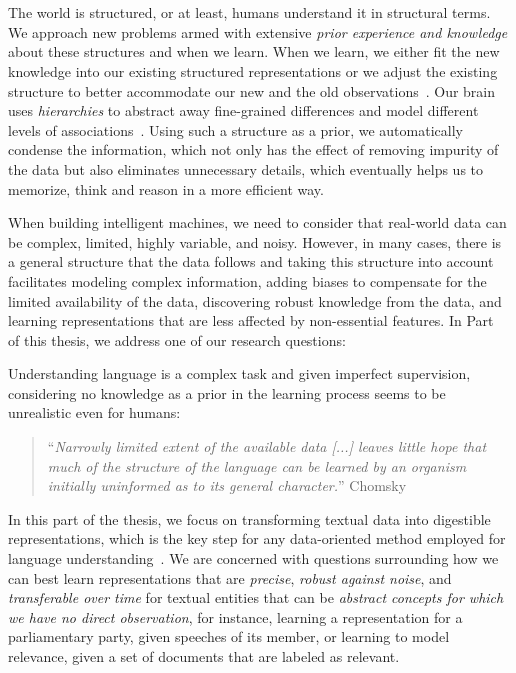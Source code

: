 \part{}
\label{part1}
%
The world is structured, or at least, humans understand it in structural terms. We approach new problems armed with extensive \emph{prior experience and knowledge} about these structures and when we learn. 
When we learn, we either fit the new knowledge into our existing structured representations or we adjust the existing structure to better accommodate our new and the old observations~\citep{battaglia2018relational}.
%
Our brain uses \emph{hierarchies} to abstract away fine-grained differences and model different levels of associations~\citep{Ballard:2015}. Using such a structure as a prior, we automatically condense the information, which not only has the effect of removing impurity of the data but also eliminates unnecessary details, which eventually helps us to memorize, think and reason in a more efficient way.

When building intelligent machines, we need to consider that real-world data can be complex, limited, highly variable, and noisy. However, in many cases, there is a general structure that the data follows and taking this structure into account facilitates modeling complex information, adding biases to compensate for the limited availability of the data, discovering robust knowledge from the data, and learning representations that are less affected by non-essential features. 
%
In Part~\ref{part1} of this thesis, we address one of our research questions:

Understanding language is a complex task and given imperfect supervision, considering no knowledge as a prior in the learning process seems to be unrealistic even for humans: 
\begin{quote}
    ``\emph{Narrowly limited extent of the available data [...] leaves little hope that much of the structure of the language can be learned by an organism initially uninformed as to its general character.}'' Chomsky~\citep{chomsky1965}
\end{quote}

In this part of the thesis, we focus on transforming textual data into digestible representations, which is the key step for any data-oriented method employed for language understanding~\citep{Bengio:2013}. 
We are concerned with questions surrounding how we can best learn representations that are \emph{precise}, \emph{robust against noise}, and \emph{transferable over time} for textual entities that can be \emph{abstract concepts for which we have no direct observation}, for instance, learning a representation for a parliamentary party, given speeches of its member, or learning to model relevance, given a set of documents that are labeled as relevant.


